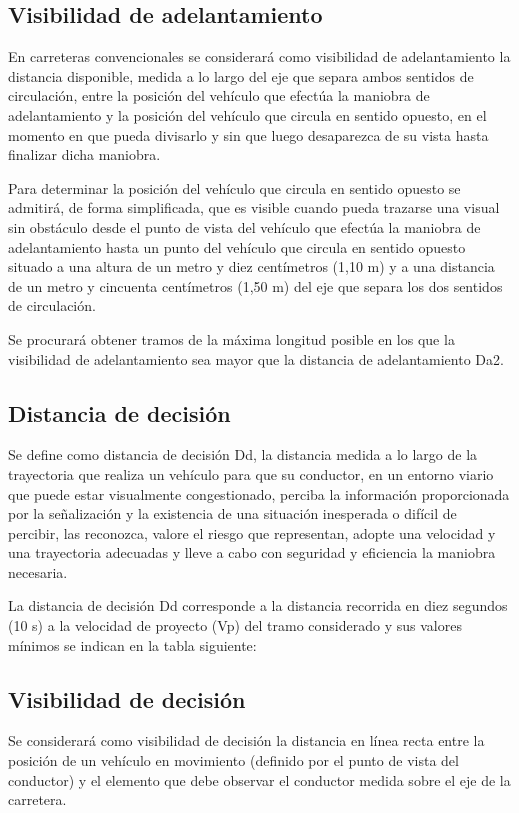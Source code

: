 \documentclass[letterpaper,10pt,english]{sphinxmanual}
\let\sphinxpxdimen\pdfpxdimen\else\newdimen\sphinxpxdimen
\begin{document}
\subsection{Visibilidad de adelantamiento}
\label{\detokenize{controles:visibilidad-de-adelantamiento}}
En carreteras convencionales se considerará como visibilidad de adelantamiento la distancia disponible, medida a lo largo del eje que separa ambos sentidos de circulación, entre la posición del vehículo que efectúa la maniobra de adelantamiento y la posición del vehículo que circula en sentido opuesto, en el momento en que pueda divisarlo y sin que luego desaparezca de su vista hasta finalizar dicha maniobra.

Para determinar la posición del vehículo que circula en sentido opuesto se admitirá, de forma simplificada, que es visible cuando pueda trazarse una visual sin obstáculo desde el punto de vista del vehículo que efectúa la maniobra de adelantamiento hasta un punto del vehículo que circula en sentido opuesto situado a una altura de un metro y diez centímetros (1,10 m) y a una distancia de un metro y cincuenta centímetros (1,50 m) del eje que separa los dos sentidos de circulación.

Se procurará obtener tramos de la máxima longitud posible en los que la visibilidad de adelantamiento sea mayor que la distancia de adelantamiento Da2.


\subsection{Distancia de decisión}
\label{\detokenize{controles:distancia-de-decision}}
Se define como distancia de decisión Dd, la distancia medida a lo largo de la trayectoria que realiza un vehículo para que su conductor, en un entorno viario que puede estar visualmente congestionado, perciba la información proporcionada por la señalización y la existencia de una situación inesperada o difícil de percibir, las reconozca, valore el riesgo que representan, adopte una velocidad y una trayectoria adecuadas y lleve a cabo con seguridad y eficiencia la maniobra necesaria.

La distancia de decisión Dd corresponde a la distancia recorrida en diez segundos (10 s) a la velocidad de proyecto (Vp) del tramo considerado y sus valores mínimos se indican en la tabla siguiente:

\noindent\sphinxincludegraphics[width=800\sphinxpxdimen]{{distdecision}.png}


\subsection{Visibilidad de decisión}
\label{\detokenize{controles:visibilidad-de-decision}}
Se considerará como visibilidad de decisión la distancia en línea recta entre la posición de un vehículo en movimiento (definido por el punto de vista del conductor) y el elemento que debe observar el conductor medida sobre el eje de la carretera.
\end{document}
